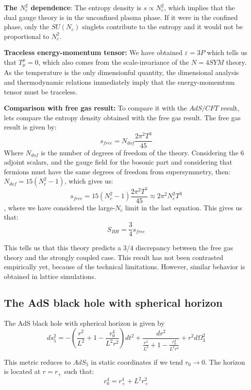 \documentclass[12pt]{article}
\begin{document}
\textbf{The $N_c^2$ dependence}: The entropy density is $s\propto N_c^2$, which implies that the dual gauge theory is in the unconfined plasma phase. If it were in the confined phase, only the $SU(N_c)$ singlets contribute to the entropy and it would not be proportional to $N_c^2$.

\vspace{.25cm}

\textbf{Traceless energy-momentum tensor:} We have obtained $\varepsilon=3P$ which tells us that $T^\mu_\mu = 0$, which also comes from the scale-invariance of the $N=4 SYM$ theory. As the temperature is the only dimensionful quantity, the dimensional analysis and thermodynamic relations immediately imply that the energy-momemtum tensor must be traceless.

\textbf{Comparison with free gas result:} To compare it with the $AdS/CFT$ result, lets compare the entropy density obtained with the free gas result. The free gas result is given by:
\[
    s_{free} = N_{dof}\frac{2\pi^2 T^3}{45}
\]
Where $N_{dof}$ is the number of degrees of freedom of the theory. Considering the 6 adjoint scalars, and the gauge field for the bosonic part and considering that fermions must have the same degrees of freedom from supersymmetry, then: $N_{dof} = 15(N_c^2-1)$, which gives us:
\[
    s_{free}= 15(N_c^2-1) \frac{2\pi^2 T^3}{45} \approx 2\pi^2N_c^2 T^3
\]
, where we have considered the large-$N_c$ limit in the last equation. This gives us that:
\[
    S_{BH} = \frac{3}{4} s_{free}
\]

This tells us that this theory predicts a $3/4$ discrepancy between the free gas theory and the strongly coupled case. This result has not been contrasted empirically yet, because of the technical limitations. However, similar behavior is obtained in lattice simulations.

\subsection{The AdS black hole with spherical horizon}

The AdS black hole with spherical horizon is given by
\[
    ds_5^2 = -\left(\frac{r^2}{L^2}+1-\frac{r_0^4}{L^2r^2}\right)dt^2+\frac{dr^2}{\frac{r^2}{L^2}+1-\frac{r_0^4}{L^2r^2}}+r^2 d\Omega_3^2
\]

This metric reduces to $AdS_5$ in static coordinates if we tend $r_0\longrightarrow 0$. The horizon is located at $r=r_+$ such that:
\[
    r_0^4 = r_+^4 + L^2r_+^2
\]
\end{document}
